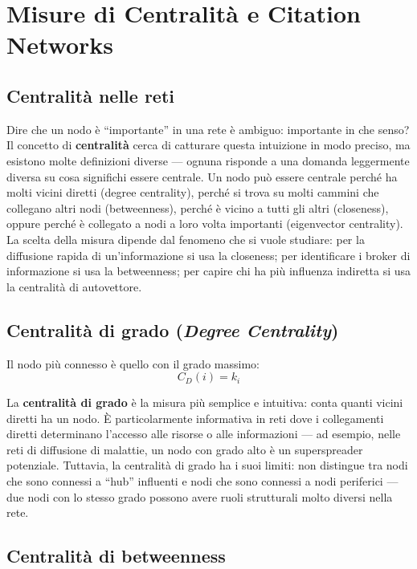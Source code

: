 \documentclass[12pt,a4paper]{article}
\newcommand{\formula}[1]{%
  \begin{equation*}#1\end{equation*}%
}
\begin{document}
\section{Misure di Centralità e Citation Networks}

\subsection{Centralità nelle reti}

Dire che un nodo è ``importante'' in una rete è ambiguo: importante in che senso?
Il concetto di \textbf{centralità} cerca di catturare questa intuizione in modo preciso,
ma esistono molte definizioni diverse — ognuna risponde a una domanda leggermente diversa
su cosa significhi essere centrale. Un nodo può essere centrale perché ha molti vicini
diretti (degree centrality), perché si trova su molti cammini che collegano altri nodi
(betweenness), perché è vicino a tutti gli altri (closeness), oppure perché è collegato
a nodi a loro volta importanti (eigenvector centrality). La scelta della misura dipende
dal fenomeno che si vuole studiare: per la diffusione rapida di un'informazione si usa
la closeness; per identificare i broker di informazione si usa la betweenness; per capire
chi ha più influenza indiretta si usa la centralità di autovettore.

\subsection{Centralità di grado (\textit{Degree Centrality})}

Il nodo più connesso è quello con il grado massimo:
\formula{C_D(i) = k_i}

\noindent La \textbf{centralità di grado} è la misura più semplice e intuitiva: conta
quanti vicini diretti ha un nodo. È particolarmente informativa in reti dove i collegamenti
diretti determinano l'accesso alle risorse o alle informazioni — ad esempio, nelle reti
di diffusione di malattie, un nodo con grado alto è un superspreader potenziale. Tuttavia,
la centralità di grado ha i suoi limiti: non distingue tra nodi che sono connessi a
``hub'' influenti e nodi che sono connessi a nodi periferici — due nodi con lo stesso grado
possono avere ruoli strutturali molto diversi nella rete.

\subsection{Centralità di betweenness}
\end{document}
